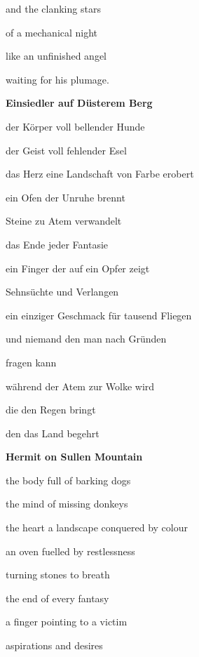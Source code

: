 and the clanking stars

of a mechanical night

like an unfinished angel 

waiting for his plumage.


\bigskip

{\bfseries
Einsiedler auf Düsterem Berg}


\bigskip


\bigskip

der Körper voll bellender Hunde

der Geist voll fehlender Esel


\bigskip

das Herz eine Landschaft von Farbe erobert

ein Ofen der Unruhe brennt

Steine zu Atem verwandelt 


\bigskip

das Ende jeder Fantasie

ein Finger der auf ein Opfer zeigt


\bigskip

Sehnsüchte und Verlangen

ein einziger Geschmack für tausend Fliegen

und niemand den man nach Gründen 

fragen kann


\bigskip

während der Atem zur Wolke wird

die den Regen bringt

den das Land begehrt 

\clearpage
\bigskip

{\bfseries
Hermit on Sullen Mountain}


\bigskip


\bigskip

the body full of barking dogs

the mind of missing donkeys


\bigskip

the heart a landscape conquered by colour

an oven fuelled by restlessness

turning stones to breath


\bigskip

the end of every fantasy

a finger pointing to a victim


\bigskip

aspirations and desires

